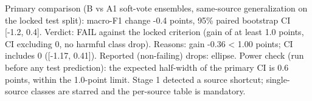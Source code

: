 Primary comparison (B vs A1 soft-vote ensembles, same-source generalization on the locked test split): macro-F1 change -0.4 points, 95\% paired bootstrap CI [-1.2, 0.4]. Verdict: FAIL against the locked criterion (gain of at least 1.0 points, CI excluding 0, no harmful class drop). Reasons: gain -0.36 < 1.00 points; CI includes 0 ([-1.17, 0.41]). Reported (non-failing) drops: ellipse. Power check (run before any test prediction): the expected half-width of the primary CI is 0.6 points, within the 1.0-point limit. Stage 1 detected a source shortcut; single-source classes are starred and the per-source table is mandatory.
